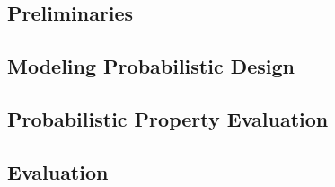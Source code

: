\subsection{Preliminaries}

\subsection{Modeling Probabilistic Design}

\subsection{Probabilistic Property Evaluation}

\subsection{Evaluation}
